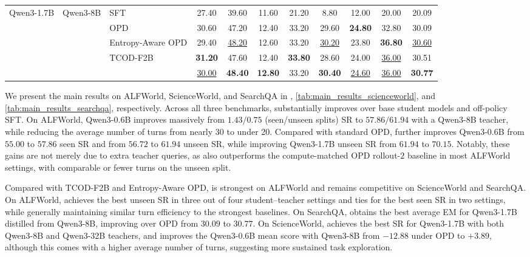 \begin{table}[htbp]
{\begin{tabular}{lllcccccccc}
\multirow{5}{*}{Qwen3-1.7B} & \multirow{5}{*}{Qwen3-8B} & SFT & 27.40 & 39.60 & 11.60 & 21.20 & 8.80 & 12.00 & 20.00 & 20.09 \\
 & & OPD & 30.60 & 47.20 & 12.40 & 33.20 & 29.60 & \textbf{24.80} & 32.80 & 30.09 \\
 & & Entropy-Aware OPD & 29.40 & \underline{48.20} & 12.60 & 33.20 & \underline{30.20} & 23.80 & \textbf{36.80} & \underline{30.60} \\
 & & TCOD-F2B & \textbf{31.20} & 47.60 & 12.40 & \textbf{33.80} & 28.60 & 24.00 & \underline{36.00} & 30.51 \\
 & & \ours{} & \underline{30.00} & \textbf{48.40} & \textbf{12.80} & 33.20 & \textbf{30.40} & \underline{24.60} & \underline{36.00} & \textbf{30.77} \\
\bottomrule
\end{tabular}%
}
\end{table}
%
We present the main results on ALFWorld, ScienceWorld, and SearchQA in , \ref{tab:main_results_scienceworld}, and \ref{tab:main_results_searchqa}, respectively.
%
Across all three benchmarks, \ours substantially improves over base student models and off-policy SFT. 
%
On ALFWorld, Qwen3-0.6B improves massively from $1.43/0.75$ (seen/unseen splits) SR to $57.86/61.94$ with a Qwen3-8B teacher, while reducing the average number of turns from nearly 30 to under 20. 
%
Compared with standard OPD, \ours further improves Qwen3-0.6B from $55.00$ to $57.86$ seen SR and from $56.72$ to $61.94$ unseen SR, while improving Qwen3-1.7B unseen SR from $61.94$ to $70.15$. 
%
Notably, these gains are not merely due to extra teacher queries, as \ours also outperforms the compute-matched OPD rollout-$2$ baseline in most ALFWorld settings, with comparable or fewer turns on the unseen split.
%


Compared with TCOD-F2B and Entropy-Aware OPD, \ours is strongest on ALFWorld and remains competitive on ScienceWorld and SearchQA. 
%
On ALFWorld, \ours achieves the best unseen SR in three out of four student--teacher settings and ties for the best seen SR in two settings, while generally maintaining similar turn efficiency to the strongest baselines. 
%
On SearchQA, \ours obtains the best average EM for Qwen3-1.7B distilled from Qwen3-8B, improving over OPD from $30.09$ to $30.77$. 
%
On ScienceWorld, \ours achieves the best SR for Qwen3-1.7B with both Qwen3-8B and Qwen3-32B teachers, and improves the Qwen3-0.6B mean score with Qwen3-8B from $-12.88$ under OPD to $+3.89$, although this comes with a higher average number of turns, suggesting more sustained task exploration.
%

